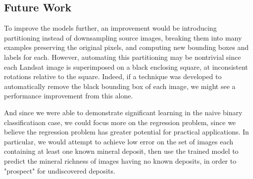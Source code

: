 \documentclass[10pt]{article}
\begin{document}



\subsection{Future Work}


To improve the models further, an improvement would be introducing partitioning instead of
downsampling source images, breaking them into many examples preserving the original pixels,
and computing new bounding boxes and labels for each. However, automating this partitioning may be nontrivial since each
Landsat image is superimposed on a black enclosing square, at inconsistent rotations relative
to the square. Indeed, if a technique was developed to automatically remove the black bounding box
of each image, we might see a performance improvement from this alone.

And since we were able to demonstrate significant learning in the naive binary
classificatiaon case, we could focus more on the regression problem, since we believe the
regression problem has greater potential for practical applications. In particular, we would
attempt to achieve low error on the set of images each containing at least one
known mineral deposit, then use the trained model to predict the mineral richness of images
having no known deposits, in order to "prospect" for undiscovered deposits.
\end{document}
